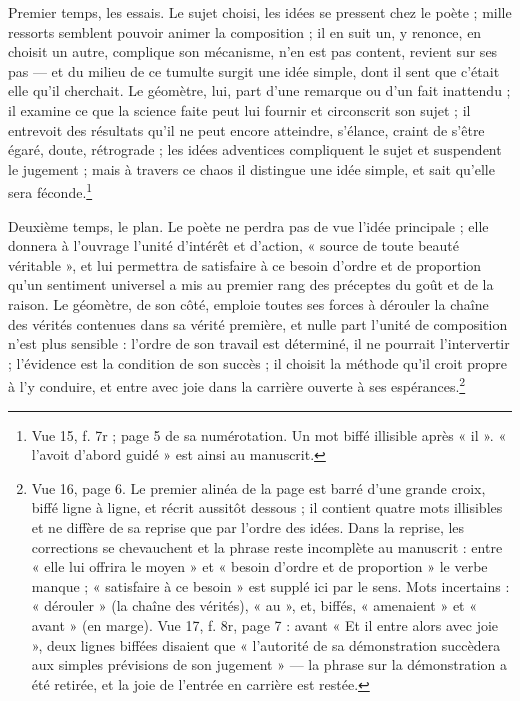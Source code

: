 \documentclass[11pt,a4paper]{article}
\begin{document}
Premier temps, les essais. Le sujet choisi, les idées se pressent chez le
poète ; mille ressorts semblent pouvoir animer la composition ; il en suit un,
y renonce, en choisit un autre, complique son mécanisme, n'en est pas content,
revient sur ses pas — et du milieu de ce tumulte surgit une idée simple, dont
il sent que c'était elle qu'il cherchait. Le géomètre, lui, part d'une
remarque ou d'un fait inattendu ; il examine ce que la science faite peut lui
fournir et circonscrit son sujet ; il entrevoit des résultats qu'il ne peut
encore atteindre, s'élance, craint de s'être égaré, doute, rétrograde ; les
idées adventices compliquent le sujet et suspendent le jugement ; mais à
travers ce chaos il distingue une idée simple, et sait qu'elle sera
féconde.\footnote{Vue 15, f. 7r ; page 5 de sa numérotation. Un mot biffé
illisible après « il ». « l'avoit d'abord guidé » est ainsi au manuscrit.}

Deuxième temps, le plan. Le poète ne perdra pas de vue l'idée principale ;
elle donnera à l'ouvrage l'unité d'intérêt et d'action, « source de toute
beauté véritable », et lui permettra de satisfaire à ce besoin d'ordre et de
proportion qu'un sentiment universel a mis au premier rang des préceptes du
goût et de la raison. Le géomètre, de son côté, emploie toutes ses forces à
dérouler la chaîne des vérités contenues dans sa vérité première, et nulle part
l'unité de composition n'est plus sensible : l'ordre de son travail est
déterminé, il ne pourrait l'intervertir ; l'évidence est la condition de son
succès ; il choisit la méthode qu'il croit propre à l'y conduire, et entre
avec joie dans la carrière ouverte à ses espérances.\footnote{Vue 16, page 6.
Le premier alinéa de la page est barré d'une grande croix, biffé ligne à ligne,
et récrit aussitôt dessous ; il contient quatre mots illisibles et ne diffère
de sa reprise que par l'ordre des idées. Dans la reprise, les corrections se
chevauchent et la phrase reste incomplète au manuscrit : entre « elle lui
offrira le moyen » et « besoin d'ordre et de proportion » le verbe manque ;
« satisfaire à ce besoin » est supplé ici par le sens. Mots incertains :
« dérouler » (la chaîne des vérités), « au », et, biffés, « amenaient » et
« avant » (en marge). Vue 17, f. 8r, page 7 : avant « Et il entre alors avec
joie », deux lignes biffées disaient que « l'autorité de sa démonstration
succèdera aux simples prévisions de son jugement » — la phrase sur la
démonstration a été retirée, et la joie de l'entrée en carrière est restée.}
\end{document}
